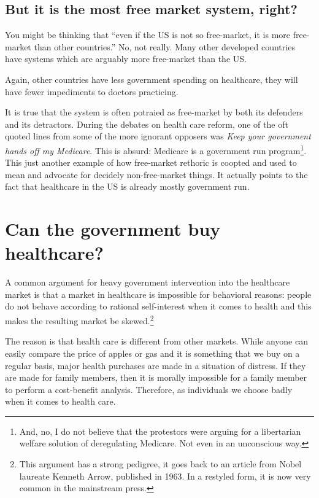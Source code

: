 \subsection{But it is the most free market system, right?}

You might be thinking that ``even if the US is not so free-market, it is more
free-market than other countries.'' No, not really. Many other developed
countries have systems which are arguably more free-market than the US.

Again, other countries have less government spending on healthcare, they will
have fewer impediments to doctors practicing.

It is true that the system is often potraied as free-market by both its
defenders and its detractors. During the debates on health care reform, one of
the oft quoted lines from some of the more ignorant opposers was \emph{Keep
your government hands off my Medicare}. This is absurd: Medicare is a
government run program\footnote{And, no, I do not believe that the protestors
were arguing for a libertarian welfare solution of deregulating Medicare. Not
even in an unconscious way.}. This just another example of how free-market
rethoric is coopted and used to mean and advocate for decidely non-free-market
things. It actually points to the fact that healthcare in the US is already
mostly government run.

\section{Can the government buy healthcare?}

A common argument for heavy government intervention into the healthcare market
is that a market in healthcare is impossible for behavioral reasons: people do
not behave according to rational self-interest when it comes to health and this
makes the resulting market be skewed.\footnote{This argument has a strong
pedigree, it goes back to an article from Nobel laureate Kenneth Arrow,
published in 1963. In a restyled form, it is now very common in the mainstream
press.}

The reason is that health care is different from other markets. While anyone
can easily compare the price of apples or gas and it is something that we buy
on a regular basis, major health purchases are made in a situation of distress.
If they are made for family members, then it is morally impossible for a family
member to perform a cost-benefit analysis. Therefore, as individuals we choose
badly when it comes to health care.

